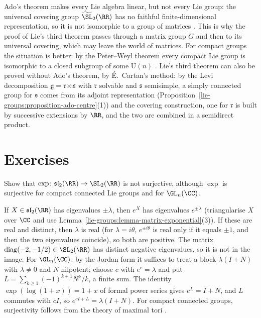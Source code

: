 \begin{remark}\label{lie-groups:remark-linear-groups}
Ado's theorem makes every Lie algebra linear, but not every Lie group: the universal covering group $\widetilde{\SL}_2(\RR)$ has no faithful finite-dimensional
representation, so it is not isomorphic to a group of matrices \cite{knapp-lie}. This is why the proof of Lie's third theorem passes through a matrix group $G$ and then
to its universal covering, which may leave the world of matrices. For compact groups the situation is better: by the Peter--Weyl theorem every compact Lie group is
isomorphic to a closed subgroup of some $\mathrm{U}(n)$ \cite{brocker-tomdieck}. Lie's third theorem can also be proved without Ado's theorem, by \'E.~Cartan's
method: by the Levi decomposition $\mathfrak{g} = \mathfrak{r} \rtimes \mathfrak{s}$ with $\mathfrak{r}$ solvable and $\mathfrak{s}$ semisimple, a simply connected group for $\mathfrak{s}$
comes from its adjoint representation (Proposition~\ref{lie-groups:proposition-ado-centre}(1)) and the covering construction, one for $\mathfrak{r}$ is built by successive
extensions by $\RR$, and the two are combined in a semidirect product.
\end{remark}

\section{Exercises}\label{lie-groups:section-exercises}

\begin{exercise}\label{lie-groups:exercise-exp-not-surjective}
Show that $\exp \colon \mathfrak{sl}_2(\RR) \to \SL_2(\RR)$ is not surjective, although $\exp$ is surjective for compact connected Lie groups and for $\GL_n(\CC)$.
\end{exercise}

\begin{solution}
If $X \in \mathfrak{sl}_2(\RR)$ has eigenvalues $\pm\lambda$, then $e^X$ has eigenvalues $e^{\pm\lambda}$ (triangularise $X$ over $\CC$ and use
Lemma~\ref{lie-groups:lemma-matrix-exponential}(3)). If these are real and distinct, then $\lambda$ is real (for $\lambda = i\theta$, $e^{\pm i\theta}$ is real
only if it equals $\pm 1$, and then the two eigenvalues coincide), so both are positive. The matrix $\operatorname{diag}(-2, -1/2) \in \SL_2(\RR)$ has distinct
negative eigenvalues, so it is not in the image. For $\GL_n(\CC)$: by the Jordan form it suffices to treat a block $\lambda(I + N)$ with $\lambda \neq 0$ and
$N$ nilpotent; choose $c$ with $e^c = \lambda$ and put $L = \sum_{k \geq 1}(-1)^{k+1}N^k/k$, a finite sum. The identity $\exp(\log(1 + x)) = 1 + x$ of formal
power series gives $e^L = I + N$, and $L$ commutes with $cI$, so $e^{cI + L} = \lambda(I + N)$. For compact connected groups, surjectivity follows from the
theory of maximal tori \cite[Chapter IV]{brocker-tomdieck}.
\end{solution}

